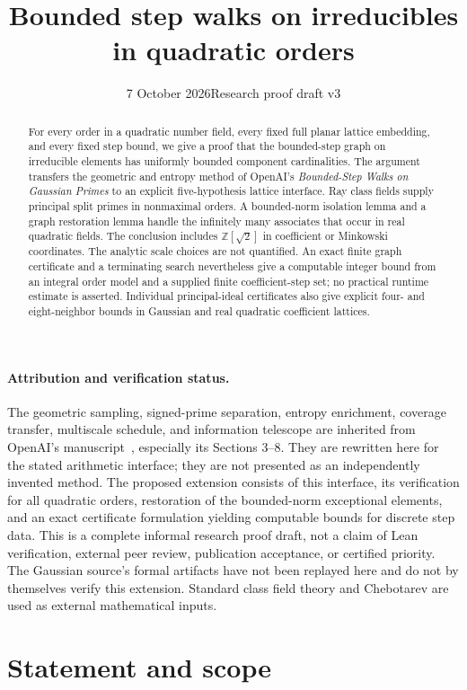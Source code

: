 \documentclass[11pt]{article}
\title{Bounded step walks on irreducibles in quadratic orders}
\author{}
\date{7 October 2026\quad\textnormal{Research proof draft v3}}
\numberwithin{equation}{section}
\theoremstyle{definition}\newtheorem{definition}[theorem]{Definition}
\theoremstyle{remark}\newtheorem{remark}[theorem]{Remark}
\newcommand{\Z}{\mathbb Z}\newcommand{\Q}{\mathbb Q}\newcommand{\R}{\mathbb R}
\begin{document}
\maketitle
\begin{abstract}
For every order in a quadratic number field, every fixed full planar lattice embedding, and every fixed step bound, we give a proof that the bounded-step graph on irreducible elements has uniformly bounded component cardinalities. The argument transfers the geometric and entropy method of OpenAI's \emph{Bounded-Step Walks on Gaussian Primes} to an explicit five-hypothesis lattice interface. Ray class fields supply principal split primes in nonmaximal orders. A bounded-norm isolation lemma and a graph restoration lemma handle the infinitely many associates that occur in real quadratic fields. The conclusion includes $\Z[\sqrt2]$ in coefficient or Minkowski coordinates. The analytic scale choices are not quantified. An exact finite graph certificate and a terminating search nevertheless give a computable integer bound from an integral order model and a supplied finite coefficient-step set; no practical runtime estimate is asserted. Individual principal-ideal certificates also give explicit four- and eight-neighbor bounds in Gaussian and real quadratic coefficient lattices.
\end{abstract}

\paragraph{Attribution and verification status.}
The geometric sampling, signed-prime separation, entropy enrichment, coverage transfer, multiscale schedule, and information telescope are inherited from OpenAI's manuscript~\cite{openai}, especially its Sections 3--8. They are rewritten here for the stated arithmetic interface; they are not presented as an independently invented method. The proposed extension consists of this interface, its verification for all quadratic orders, restoration of the bounded-norm exceptional elements, and an exact certificate formulation yielding computable bounds for discrete step data. This is a complete informal research proof draft, not a claim of Lean verification, external peer review, publication acceptance, or certified priority. The Gaussian source's formal artifacts have not been replayed here and do not by themselves verify this extension. Standard class field theory and Chebotarev are used as external mathematical inputs.

\section{Statement and scope}
\end{document}
